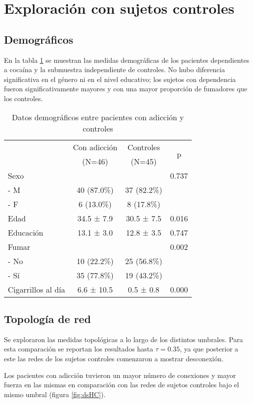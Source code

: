 \section{Exploración con sujetos controles}
\subsection{Demográficos}

En la tabla \ref{tab:demHC} se muestran las medidas demográficas de los pacientes dependientes a cocaína y la submuestra independiente de controles.
No hubo diferencia significativa en el género ni en el nivel educativo; los sujetos con dependencia fueron significativamente mayores y con una mayor proporción de fumadores que los controles.

\begin{table}[hbp]
    \centering
    \small
    \caption{Datos demográficos entre pacientes con adicción y controles}
    \label{tab:demHC}
    \begin{tabular}{lccc}
        \hline
        & Con adicción & Controles & \multirow{2}{*}{p}\\
        & (N=46) & (N=45) & \\
        \hline
        Sexo            &  &  & 0.737\\
        - M           & 40 (87.0\%) & 37 (82.2\%) & \\
        - F           & 6 (13.0\%) & 8 (17.8\%) & \\
        Edad            & 34.5 ±  7.9 & 30.5 ±  7.5 & 0.016\\
        Educación       & 13.1 ±  3.0 & 12.8 ±  3.5 & 0.747\\
        Fumar           &  &  & 0.002\\
        - No          & 10 (22.2\%) & 25 (56.8\%) & \\
        - Sí          & 35 (77.8\%) & 19 (43.2\%) & \\
        Cigarrillos al día &  6.6 ± 10.5 &  0.5 ±  0.8 & 0.000\\
        \hline
    \end{tabular}
\end{table}

\subsection{Topología de red}
Se exploraron las medidas topológicas a lo largo de los distintos umbrales.
Para esta comparación se reportan los resultados hasta $\tau = 0.35$, ya que posterior a este las redes de los sujetos controles comenzaron a mostrar desconexión.\par
Los pacientes con adicción tuvieron un mayor número de conexiones y mayor fuerza en las mismas en comparación con las redes de sujetos controles
bajo el mismo umbral (figura \ref{fig:dsHC}).

